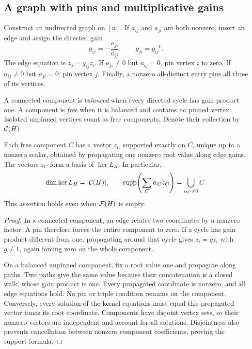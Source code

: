 \subsection{A graph with pins and multiplicative gains}
Construct an undirected graph on $[n]$. If $a_{ij}$ and $a_{ji}$ are both nonzero, insert an edge and assign the directed gain
\begin{equation}\label{eq:gain}
 g_{ij}=-\frac{a_{ji}}{a_{ij}},\qquad g_{ji}=g_{ij}^{-1}.
\end{equation}
The edge equation is $z_j=g_{ij}z_i$. If $a_{ji}\ne0$ but $a_{ij}=0$, pin vertex $i$ to zero. If $a_{ij}\ne0$ but $a_{ji}=0$, pin vertex $j$. Finally, a nonzero all-distinct entry pins all three of its vertices.

A connected component is \emph{balanced} when every directed cycle has gain product one. A component is \emph{free} when it is balanced and contains no pinned vertex. Isolated unpinned vertices count as free components. Denote their collection by $\mathcal C(H)$.

\begin{theorem}\label{thm:graph}
Each free component $C$ has a vector $z_C$ supported exactly on $C$, unique up to a nonzero scalar, obtained by propagating one nonzero root value along edge gains. The vectors $z_C$ form a basis of $\ker L_H$. In particular,
\begin{equation}\label{eq:graph-null}
 \dim\ker L_H=|\mathcal C(H)|,
 \qquad
 \operatorname{supp}\!\left(\sum_C\alpha_Cz_C\right)
 =\bigcup_{\alpha_C\ne0}C.
\end{equation}
This assertion holds even when $\mathcal F(H)$ is empty.
\end{theorem}
\begin{proof}
In a connected component, an edge relates two coordinates by a nonzero factor. A pin therefore forces the entire component to zero. If a cycle has gain product different from one, propagating around that cycle gives $z_i=gz_i$ with $g\ne1$, again forcing zero on the whole component.

On a balanced unpinned component, fix a root value one and propagate along paths. Two paths give the same value because their concatenation is a closed walk, whose gain product is one. Every propagated coordinate is nonzero, and all edge equations hold. No pin or triple condition remains on the component. Conversely, every solution of the kernel equations must equal this propagated vector times its root coordinate. Components have disjoint vertex sets, so their nonzero vectors are independent and account for all solutions. Disjointness also prevents cancellation between nonzero component coefficients, proving the support formula.
\end{proof}

